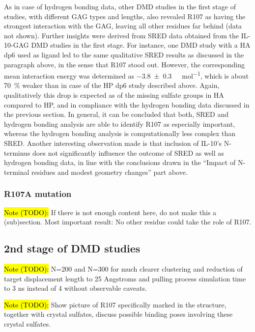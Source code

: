 As in case of hydrogen bonding data, other DMD studies in the first stage of
studies, with different GAG types and lengths, also revealed R107 as having the
strongest interaction with the GAG, leaving all other residues far behind (data
not shown). Further insights were derived from SRED data obtained from the
IL-10-GAG DMD studies in the first stage. For instance, one DMD study with a HA
dp6 used as ligand led to the same qualitative SRED results as discussed in the
paragraph above, in the sense that R107 stood out. However, the corresponding
mean interaction energy was determined as \SI{-3.8 +-0.3}{\kilo\calory\per\mol},
which is about \SI{70}{\percent} weaker than in case of the HP dp6 study
described above. Again, qualitatively this drop is expected as of the missing
sulfate groups in HA compared to HP, and in compliance with the hydrogen bonding
data discussed in the previous section. In general, it can be concluded that
both, SRED and hydrogen bonding analysis are able to identify R107 as especially
important, whereas the hydrogen bonding analysis is computationally less complex
than SRED. Another interesting observation made is that inclusion of IL-10's
N-terminus does not significantly influence the outcome of SRED as well as
hydrogen bonding data, in line with the conclusions drawn in the
\enquote{Impact of N-terminal residues and modest geometry changes} part above.



\subsubsection{R107A mutation}

\hl{Note (TODO):}
If there is not enough content here, do not make this a (sub)section.
Most important result: No other residue could take the role of R107.


\subsection{2nd stage of DMD studies}

\hl{Note (TODO):}
N=200 and N=300 for much clearer clustering and reduction of target displacement
length to 25 Angstroms and pulling process simulation time to 3 ns instead of 4
without observable caveats.

\hl{Note (TODO):}
Show picture of R107 specifically marked in the structure, together with
crystal sulfates, discuss possible binding poses involving these crystal
sulfates.


